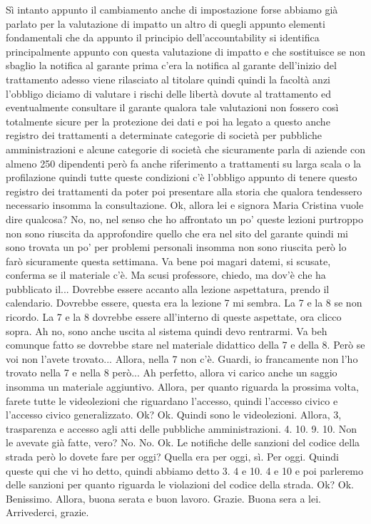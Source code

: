 Sì intanto appunto il cambiamento anche di impostazione forse abbiamo già parlato per la valutazione di impatto un altro di quegli appunto elementi fondamentali che da appunto il principio dell'accountability si identifica principalmente appunto con questa valutazione di impatto e che sostituisce se non sbaglio la notifica al garante prima c'era la notifica al garante dell'inizio del trattamento adesso viene rilasciato al titolare quindi quindi la facoltà anzi l'obbligo diciamo di valutare i rischi delle libertà dovute al trattamento ed eventualmente consultare il garante qualora tale valutazioni non fossero così totalmente sicure per la protezione dei dati e poi ha legato a questo anche registro dei trattamenti a determinate categorie di società per pubbliche amministrazioni e alcune categorie di società che sicuramente parla di aziende con almeno 250 dipendenti però fa anche riferimento a trattamenti su larga scala o la profilazione quindi tutte queste condizioni c'è l'obbligo appunto di tenere questo registro dei trattamenti da poter poi presentare alla storia che qualora tendessero necessario insomma la consultazione.
Ok, allora lei e signora Maria Cristina vuole dire qualcosa?
No, no, nel senso che ho affrontato un po' queste lezioni purtroppo non sono riuscita da approfondire quello che era nel sito del garante quindi mi sono trovata un po' per problemi personali insomma non sono riuscita però lo farò sicuramente questa settimana.
Va bene poi magari datemi, si scusate, conferma se il materiale c'è.
Ma scusi professore, chiedo, ma dov'è che ha pubblicato il...
Dovrebbe essere accanto alla lezione aspettatura, prendo il calendario.
Dovrebbe essere, questa era la lezione 7 mi sembra.
La 7 e la 8 se non ricordo.
La 7 e la 8 dovrebbe essere all'interno di queste aspettate, ora clicco sopra.
Ah no, sono anche uscita al sistema quindi devo rentrarmi.
Va beh comunque fatto se dovrebbe stare nel materiale didattico della 7 e della 8.
Però se voi non l'avete trovato...
Allora, nella 7 non c'è.
Guardi, io francamente non l'ho trovato nella 7 e nella 8 però...
Ah perfetto, allora vi carico anche un saggio insomma un materiale aggiuntivo.
Allora, per quanto riguarda la prossima volta, farete tutte le videolezioni che riguardano l'accesso, quindi l'accesso civico e l'accesso civico generalizzato.
Ok?
Ok.
Quindi sono le videolezioni.
Allora, 3, trasparenza e accesso agli atti delle pubbliche amministrazioni.
4.
10.
9.
10.
Non le avevate già fatte, vero?
No.
No.
Ok.
Le notifiche delle sanzioni del codice della strada però lo dovete fare per oggi?
Quella era per oggi, sì.
Per oggi.
Quindi queste qui che vi ho detto, quindi abbiamo detto 3.
4 e 10.
4 e 10 e poi parleremo delle sanzioni per quanto riguarda le violazioni del codice della strada.
Ok?
Ok.
Benissimo.
Allora, buona serata e buon lavoro.
Grazie.
Buona sera a lei.
Arrivederci, grazie.